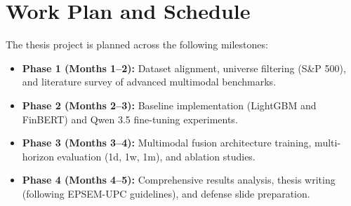 \documentclass[11pt,a4paper]{article}
\begin{document}
\section{Work Plan and Schedule}
\label{sec:schedule}

The thesis project is planned across the following milestones:
\begin{itemize}[leftmargin=*, noitemsep]
    \item \textbf{Phase 1 (Months 1--2):} Dataset alignment, universe filtering (S\&P 500), and literature survey of advanced multimodal benchmarks.
    \item \textbf{Phase 2 (Months 2--3):} Baseline implementation (LightGBM and FinBERT) and Qwen 3.5 fine-tuning experiments.
    \item \textbf{Phase 3 (Months 3--4):} Multimodal fusion architecture training, multi-horizon evaluation (1d, 1w, 1m), and ablation studies.
    \item \textbf{Phase 4 (Months 4--5):} Comprehensive results analysis, thesis writing (following EPSEM-UPC guidelines), and defense slide preparation.
\end{itemize}

\newpage


\end{document}
